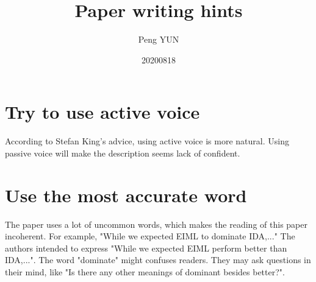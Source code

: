 \documentclass{article}
\title{Paper writing hints}
\author{Peng YUN}
\date{20200818}
\begin{document}
    \maketitle
\section{Try to use active voice}
    According to Stefan King's advice,
    using active voice is more natural.
    Using passive voice will make the description
    seems lack of confident.

\section{Use the most accurate word}
    The paper \cite{Liu2020} uses a lot of uncommon words,
    which makes the reading of this paper incoherent.
    For example, "While we expected EIML to dominate IDA,..."
    The authors intended to express "While we expected EIML perform better than IDA,...".
    The word "dominate" might confuses readers.
    They may ask questions in their mind, like
    "Is there any other meanings of dominant besides better?".


\end{document}
